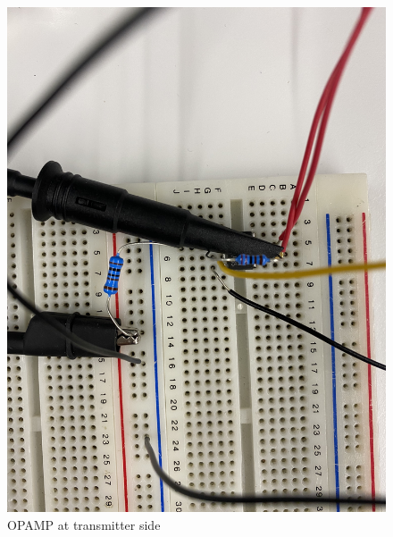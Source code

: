 \documentclass[12pt,a4paper]{report}
\begin{document}
\begin{figure}
    \centerline{\includegraphics[scale=0.1]{OPAMP_Transmitter.PNG}}
    \caption{OPAMP at transmitter side}
    \label{fig:OPAMPT}
\end{figure}
\end{document}
